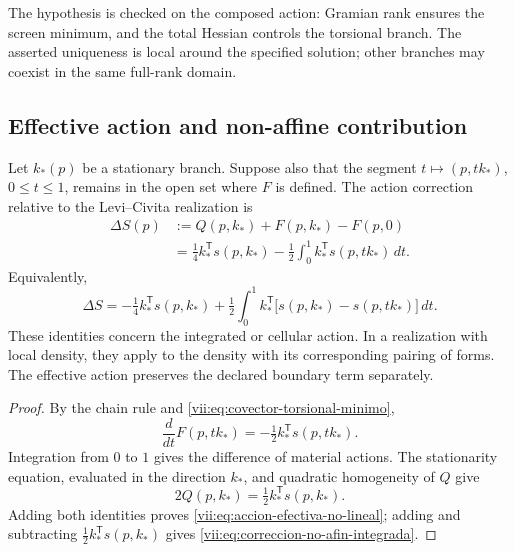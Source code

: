 The hypothesis is checked on the composed action: Gramian rank
ensures the screen minimum, and the total Hessian controls
the torsional branch. The asserted uniqueness is local around the
specified solution; other branches may coexist in the same
full-rank domain.

\subsection{Effective action and non-affine contribution}
\label{vii:subsec:accion-efectiva-no-afin}

\begin{theorem}
\label{vii:thm:eliminacion-torsional-no-lineal}
Let \(k_*(p)\) be a stationary branch. Suppose also that the
segment \(t\mapsto (p,tk_*)\), \(0\leq t\leq1\), remains
in the open set where \(F\) is defined. The action correction
relative to the Levi--Civita realization is
\begin{equation}
 \begin{split}
 \Delta S(p)
  &:=Q(p,k_*)+F(p,k_*)-F(p,0)\\
  &=\tfrac14 k_*^{\mathsf T}s(p,k_*)
     -\tfrac12\int_0^1
           k_*^{\mathsf T}s(p,tk_*)\,dt.
 \end{split}
 \label{vii:eq:accion-efectiva-no-lineal}
\end{equation}
Equivalently,
\begin{equation}
 \Delta S=-\tfrac14 k_*^{\mathsf T}s(p,k_*)
  +\tfrac12\int_0^1 k_*^{\mathsf T}
       \bigl[s(p,k_*)-s(p,tk_*)\bigr]\,dt.
 \label{vii:eq:correccion-no-afin-integrada}
\end{equation}
These identities concern the integrated or cellular action.
In a realization with local density, they apply to the density
with its corresponding pairing of forms. The effective action
preserves the declared boundary term separately.
\end{theorem}

\begin{proof}
By the chain rule and
\eqref{vii:eq:covector-torsional-minimo},
\[
 \frac{d}{dt}F(p,tk_*)
      =-\tfrac12 k_*^{\mathsf T}s(p,tk_*).
\]
Integration from \(0\) to \(1\) gives the difference of
material actions. The stationarity equation, evaluated in the
direction \(k_*\), and quadratic homogeneity of \(Q\) give
\[
 2Q(p,k_*)=\tfrac12 k_*^{\mathsf T}s(p,k_*).
\]
Adding both identities proves
\eqref{vii:eq:accion-efectiva-no-lineal}; adding and subtracting
\(\tfrac12k_*^{\mathsf T}s(p,k_*)\) gives
\eqref{vii:eq:correccion-no-afin-integrada}.
\end{proof}


